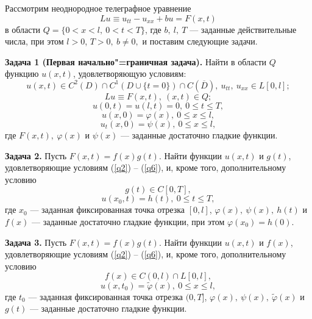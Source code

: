 
\vzmscaption

Рассмотрим неоднородное телеграфное уравнение
\begin{equation}\label{q1}Lu\equiv u_{tt}-u_{xx}+bu=F(x,t)\end{equation}
в области $Q=\{0<x<l,\ 0<t<T\}$, где $b,\ l,\ T$ --- заданные действительные числа, при этом $l>0$, $T>0,\ b\not=0,$ и поставим следующие задачи.

\textbf{Задача 1 (Первая начально"=граничная задача).} Найти в области $Q$ функцию $u(x,t)$, удовлетворяющую условиям:
\begin{equation}\label{q2}u(x,t)\in C^2(D)\cap C^1(D\cup\{t=0\})\cap C(\overline{D}),\ u_{tt},\ u_{xx}\in L[0,l];\end{equation}
\begin{equation}\label{q3}Lu\equiv F(x,t),\ (x,t)\in Q;\end{equation}
\begin{equation}\label{q4}u(0,t)=u(l,t)=0,\ 0\leqslant t\leqslant T,\end{equation}
\begin{equation}\label{q5}u(x,0)=\varphi(x),\ 0\leqslant x\leqslant l,\end{equation}
\begin{equation}\label{q6}u_t(x,0)=\psi(x),\ 0\leqslant x\leqslant l,\end{equation}
где $F(x,t),\ \varphi(x)$ и $\psi(x)$ --- заданные достаточно гладкие функции.

{\bf Задача 2.} Пусть $F(x,t)=f(x)g(t)$. Найти функции $u(x,t)$ и $g(t)$, удовлетворяющие условиям (\ref{q2}) -- (\ref{q6}), и, кроме того, дополнительному условию
\begin{equation}\label{q8.1.0}g(t)\in C[0,T],\end{equation}
\begin{equation}\label{q8.1}u(x_0,t)=h(t),\ 0\leqslant t\leqslant T,\end{equation}
где $x_0$ --- заданная фиксированная точка отрезка $[0,l]$, $\varphi(x),\ \psi(x),\ h(t)$ и $f(x)$ --- заданные достаточно гладкие функции, при этом $\varphi(x_0)=h(0).$

{\bf Задача 3.} Пусть $F(x,t)=f(x)g(t)$. Найти функции $u(x,t)$ и $f(x)$, удовлетворяющие условиям (\ref{q2}) -- (\ref{q6}), и, кроме того, дополнительному условию
\begin{equation}\label{q8.2.0}f(x)\in C(0,l)\cap L[0,l],\end{equation}
\begin{equation}\label{q8.2}u(x,t_0)=\widetilde{\varphi}(x),\ 0\leqslant x\leqslant l,\end{equation}
где $t_0$ --- заданная фиксированная точка отрезка $(0,T]$, $\varphi(x),\ \psi(x),\ \widetilde{\varphi}(x)$ и $g(t)$ --- заданные достаточно гладкие функции.

